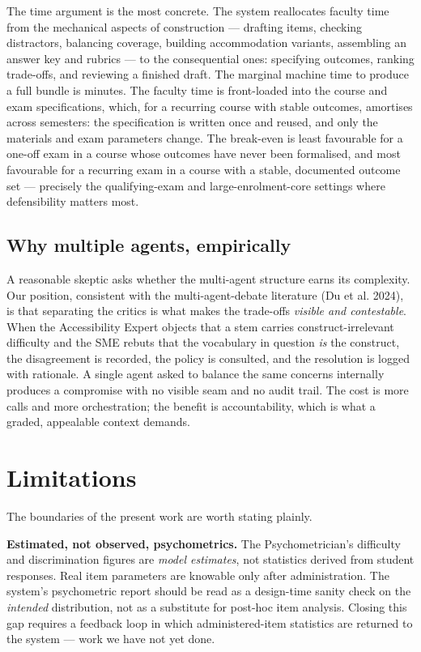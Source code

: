 \documentclass[
  11pt,
  letterpaper,
]{article}
\begin{document}
The time argument is the most concrete. The system reallocates faculty
time from the mechanical aspects of construction --- drafting items,
checking distractors, balancing coverage, building accommodation
variants, assembling an answer key and rubrics --- to the consequential
ones: specifying outcomes, ranking trade-offs, and reviewing a finished
draft. The marginal machine time to produce a full bundle is minutes.
The faculty time is front-loaded into the course and exam
specifications, which, for a recurring course with stable outcomes,
amortises across semesters: the specification is written once and
reused, and only the materials and exam parameters change. The
break-even is least favourable for a one-off exam in a course whose
outcomes have never been formalised, and most favourable for a recurring
exam in a course with a stable, documented outcome set --- precisely the
qualifying-exam and large-enrolment-core settings where defensibility
matters most.

\subsection{Why multiple agents,
empirically}\label{why-multiple-agents-empirically}

A reasonable skeptic asks whether the multi-agent structure earns its
complexity. Our position, consistent with the multi-agent-debate
literature (Du et al. 2024), is that separating the critics is what
makes the trade-offs \emph{visible and contestable}. When the
Accessibility Expert objects that a stem carries construct-irrelevant
difficulty and the SME rebuts that the vocabulary in question \emph{is}
the construct, the disagreement is recorded, the policy is consulted,
and the resolution is logged with rationale. A single agent asked to
balance the same concerns internally produces a compromise with no
visible seam and no audit trail. The cost is more calls and more
orchestration; the benefit is accountability, which is what a graded,
appealable context demands.

\section{Limitations}\label{limitations}

The boundaries of the present work are worth stating plainly.

\textbf{Estimated, not observed, psychometrics.} The Psychometrician's
difficulty and discrimination figures are \emph{model estimates}, not
statistics derived from student responses. Real item parameters are
knowable only after administration. The system's psychometric report
should be read as a design-time sanity check on the \emph{intended}
distribution, not as a substitute for post-hoc item analysis. Closing
this gap requires a feedback loop in which administered-item statistics
are returned to the system --- work we have not yet done.
\end{document}

